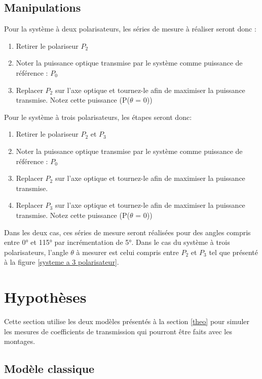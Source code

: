 \documentclass[11pt,letterpaper]{article}
\begin{document}
\subsection{Manipulations}

Pour la système à deux polarisateurs, les séries de mesure à réaliser seront donc :

\begin{enumerate}
    \item Retirer le polariseur $P_2$
    \item Noter la puissance optique transmise par le système comme puissance de référence : $P_0$
    \item Replacer $P_2$ sur l’axe optique et tournez-le afin de maximiser la puissance transmise. Notez cette puissance (P($\theta$ = 0))
\end{enumerate}

Pour le système à trois polarisateurs, les étapes seront donc: 

\begin{enumerate}
    \item Retirer le polariseur $P_2$ et $P_3$
    \item Noter la puissance optique transmise par le système comme puissance de référence : $P_0$
    \item Replacer $P_2$ sur l’axe optique et tournez-le afin de maximiser la puissance transmise.
    \item Replacer $P_3$ sur l’axe optique et tournez-le afin de maximiser la puissance transmise. Notez cette puissance (P($\theta$ = 0))
\end{enumerate}

Dans les deux cas, ces séries de mesure seront réalisées pour des angles compris entre 0° et 115° par incrémentation de 5°. Dans le cas du système à trois polarisateurs, l'angle $\theta$ à mesurer est celui compris entre $P_2$ et $P_3$ tel que présenté à la figure \ref{systeme a 3 polarisateur}.

\section{Hypothèses}

Cette section utilise les deux modèles présentés à la section \ref{theo} pour simuler les mesures de
coefficients de transmission qui pourront être faits avec les montages.

\subsection{Modèle classique}
\end{document}
